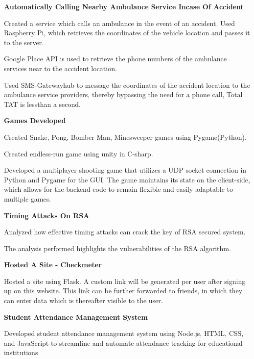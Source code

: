 \begin{cventries}
  \cventry
    { \textbf{ Automatically Calling Nearby Ambulance Service Incase Of Accident } }{}{}{}
    {
      \begin{cvitems}
        \item {Created a service which calls an ambulance in the event of an accident. Used Raspberry Pi, which retrieves the coordinates of the vehicle location and passes it to the server.}
        \item {Google Place API is used to retrieve the phone numbers of the ambulance services near to the accident location.}
        \item {Used SMS-Gatewayhub to message the coordinates of the accident location to the ambulance service providers, thereby bypassing the need for a phone call, Total TAT is lessthan a second.}
      \end{cvitems}
    }
  \cventry
    { \textbf{Games Developed} }{}{}{}
    {
      \begin{cvitems}
        \item {Created Snake, Pong, Bomber Man, Minesweeper games using Pygame(Python).}
        \item {Created endless-run game using unity in C-sharp.}
        \item {Developed a multiplayer shooting game that utilizes a UDP socket connection in Python and Pygame for the GUI. The game maintains its state on the client-side, which allows for the backend code to remain flexible and easily adaptable to multiple games.}
      \end{cvitems}
    }
  \cventry
    {\textbf{Timing Attacks On RSA}}{}{}{}
    {
      \begin{cvitems}
        \item {Analyzed how effective timing attacks can crack the key of RSA secured system.}
        \item {The analysis performed highlights the vulnerabilities of the RSA algorithm.}
      \end{cvitems}
    }
  \cventry
    { \textbf{ Hosted A Site - Checkmeter } }{}{}{}
    {
      \begin{cvitems}
        \item {Hosted a site using Flask. A custom link will be generated per user after signing up on this website. This link can be further forwarded to friends, in which they can enter data which is thereafter visible to the user.}
      \end{cvitems}
    }
  \cventry
    { \textbf{ Student Attendance Management System } }{}{}{}
    {
      \begin{cvitems}
        \item {Developed student attendance management system using Node.js, HTML, CSS, and JavaScript to streamline and automate attendance tracking for educational institutions}
      \end{cvitems}
    }
  
\end{cventries}